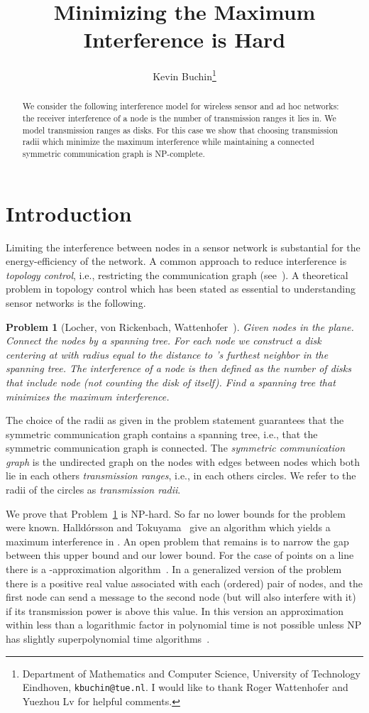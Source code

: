 \documentclass{article}
\title{Minimizing the Maximum Interference is Hard}\author{Kevin Buchin\thanks{Department of Mathematics and Computer Science, University of Technology Eindhoven, {\tt kbuchin@tue.nl}. I would like to thank Roger Wattenhofer and Yuezhou Lv for helpful comments.}}\date{}
\theoremstyle{plain}
\newtheorem{prb}{Problem}
\theoremstyle{definition}
\theoremstyle{remark}
\begin{document}
\maketitle

\begin{abstract}
We consider the following interference model for wireless sensor and ad hoc networks:
the receiver interference of a node is the number of transmission ranges it lies in.
We model transmission ranges as disks. For this case we show that
choosing transmission radii which
minimize the maximum interference while maintaining a connected symmetric
communication graph is NP-complete.
\end{abstract}

\section{Introduction}
Limiting the interference between nodes in a sensor network is substantial
for the energy-efficiency of the network. A common approach to reduce
interference is \emph{topology control}, i.e., restricting the communication
graph (see~\cite{bb-tc-07,k-isnr-07}). A theoretical problem in topology control which has been stated as
essential to understanding sensor networks is the following.

\begin{prb}[Locher, von Rickenbach, Wattenhofer~\cite{lrw-sncp-08}]\label{prb:tc}
Given  nodes in the plane. Connect the nodes by a spanning tree.
For each node  we construct a disk centering at  with radius equal
to the distance to 's furthest neighbor in the spanning tree. The interference
of a node  is then defined as the number of disks that include node 
(not counting the disk of  itself). Find
a spanning tree that minimizes the maximum interference.
\end{prb}
The choice of the radii as given in the problem statement guarantees that
the symmetric communication graph contains a spanning tree, i.e., that
the symmetric communication graph is connected.
The \emph{symmetric communication graph} is the undirected graph on the nodes
with edges between nodes which both lie in each others
\emph{transmission ranges}, i.e., in each others circles. We refer to the
radii of the circles as \emph{transmission radii}.

We prove that Problem~\ref{prb:tc} is NP-hard.
So far no lower bounds for the problem were known. Halld{\'o}rsson and
Tokuyama~\cite{ht-miwan-06} give an algorithm which yields a
maximum interference in .
An open problem that remains is to narrow the gap between this upper bound and
our lower bound.
For the case of points on a line there is a
-approximation algorithm~\cite{rswz-rim-05}.
In a generalized version of the problem there is a positive real value
associated with each (ordered) pair of nodes, and the first node can send a message
to the second node (but will also interfere with it) if its transmission power is above this
value. In this version an approximation within less than a logarithmic factor in polynomial
time is not possible unless NP has slightly superpolynomial time algorithms~\cite{bp-cmi-06}.
\end{document}

